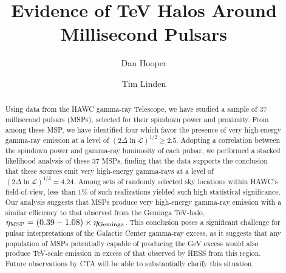 \documentclass[aps,prd,twocolumn,amsmath,superscriptaddress,amssymb,showpacs,floatfix,nofootinbib,longbibliography,preprintnumbers]{revtex4-1}
\begin{document}



\title{Evidence of TeV Halos Around Millisecond Pulsars}


\author{Dan Hooper}

\author{Tim Linden}


\begin{abstract}

Using data from the HAWC gamma-ray Telescope, we have studied a sample of 37 millisecond pulsars (MSPs), selected for their spindown power and proximity. From among these MSP, we have identified four which favor the presence of very high-energy gamma-ray emission at a level of  $(2\Delta \ln \mathcal{L})^{1/2} \ge 2.5$. Adopting a correlation between the spindown power and gamma-ray luminosity of each pulsar, we performed a stacked likelihood analysis of these 37 MSPs, finding that the data supports the conclusion that these sources emit very high-energy gamma-rays at a level of $(2\Delta \ln \mathcal{L})^{1/2} = 4.24$. Among sets of randomly selected sky locations within HAWC's field-of-view, less than 1\% of such realizations yielded such high statistical significance. Our analysis suggests that MSPs produce very high-energy gamma-ray emission with a similar efficiency to that observed from the Geminga TeV-halo, $\eta_{\rm MSP} = (0.39-1.08) \times \eta_{\rm Geminga}$. This conclusion poses a significant challenge for pulsar interpretations of the Galactic Center gamma-ray excess, as it suggests that any population of MSPs potentially capable of producing the GeV excess would also produce TeV-scale emission in excess of that observed by HESS from this region. Future observations by CTA will be able to substantially clarify this situation.



\end{abstract}

\maketitle
\end{document}
